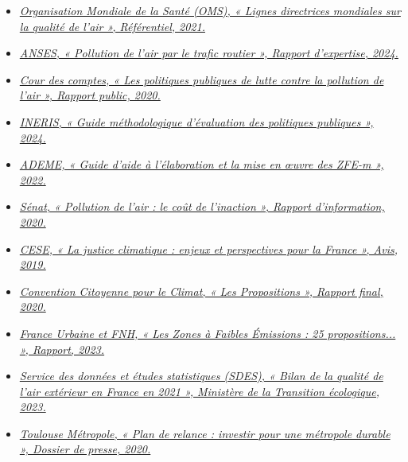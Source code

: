\documentclass[12pt,a4paper]{article}
\begin{document}
\begin{itemize}
    \item \textit{\href{https://www.who.int/fr/news/item/22-09-2021-new-who-global-air-quality-guidelines-aim-to-save-millions-of-lives-from-air-pollution}{Organisation Mondiale de la Santé (OMS), « Lignes directrices mondiales sur la qualité de l’air », Référentiel, 2021.}}
    \item \textit{\href{https://www.anses.fr/fr/system/files/AIR2021SA0039RA.pdf}{ANSES, « Pollution de l’air par le trafic routier », Rapport d'expertise, 2024.}}
    \item \textit{\href{https://www.ccomptes.fr/fr/publications/les-politiques-de-lutte-contre-la-pollution-de-lair}{Cour des comptes, « Les politiques publiques de lutte contre la pollution de l'air », Rapport public, 2020.}}
    \item \textit{\href{https://www.lcsqa.org/fr/rapport/guide-methodologique-devaluation-des-politiques-publiques-relatives-la-qualite-de-lair-2024}{INERIS, « Guide méthodologique d'évaluation des politiques publiques », 2024.}}
    \item \textit{\href{https://librairie.ademe.fr/air/5786-guide-d-aide-a-l-elaboration-et-la-mise-en-oeuvre-des-zfe-m.html}{ADEME, « Guide d'aide à l'élaboration et la mise en œuvre des ZFE-m », 2022.}}
    \item \textit{\href{https://www.senat.fr/rap/r19-719/r19-7191.html}{Sénat, « Pollution de l'air : le coût de l'inaction », Rapport d'information, 2020.}}
    \item \textit{\href{https://www.lecese.fr/travaux-publies/la-justice-climatique-enjeux-et-perspectives-pour-la-france}{CESE, « La justice climatique : enjeux et perspectives pour la France », Avis, 2019.}}
    \item \textit{\href{https://propositions.conventioncitoyennepourleclimat.fr/pdf/ccc-rapport-final.pdf}{Convention Citoyenne pour le Climat, « Les Propositions », Rapport final, 2020.}}
    \item 
    \textit{\href{https://www.vie-publique.fr/files/rapport/pdf/290236.pdf}{France Urbaine et FNH, « Les Zones à Faibles Émissions : 25 propositions... », Rapport, 2023.}}
    \item \textit{\href{https://www.statistiques.developpement-durable.gouv.fr/bilan-de-la-qualite-de-lair-exterieur-en-france-en-2021}{Service des données et études statistiques (SDES), « Bilan de la qualité de l’air extérieur en France en 2021 », Ministère de la Transition écologique, 2023.}}
    \item \textit{\href{https://metropole.toulouse.fr/sites/toulouse-fr/files/2022-08/dp_planderelance_investirpourunemetropoledurable.pdf}{Toulouse Métropole, « Plan de relance : investir pour une métropole durable », Dossier de presse, 2020.}}

\end{itemize}
\end{document}
